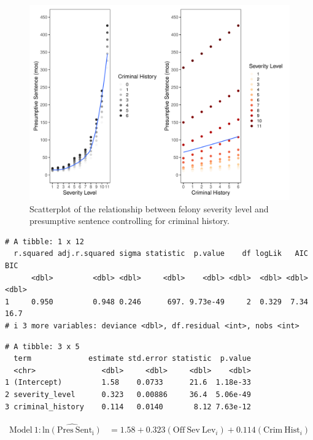 \documentclass[
  letterpaper,
  DIV=11,
  numbers=noendperiod]{scrartcl}
\begin{document}
\begin{figure}

{\centering \includegraphics{sentencing_grid_files/figure-pdf/fig-scatter-1.pdf}

}

\caption{\label{fig-scatter}Scatterplot of the relationship between
felony severity level and presumptive sentence controlling for criminal
history.}

\end{figure}

\begin{verbatim}
# A tibble: 1 x 12
  r.squared adj.r.squared sigma statistic  p.value    df logLik   AIC   BIC
      <dbl>         <dbl> <dbl>     <dbl>    <dbl> <dbl>  <dbl> <dbl> <dbl>
1     0.950         0.948 0.246      697. 9.73e-49     2  0.329  7.34  16.7
# i 3 more variables: deviance <dbl>, df.residual <int>, nobs <int>
\end{verbatim}

\begin{verbatim}
# A tibble: 3 x 5
  term             estimate std.error statistic  p.value
  <chr>               <dbl>     <dbl>     <dbl>    <dbl>
1 (Intercept)         1.58    0.0733      21.6  1.18e-33
2 severity_level      0.323   0.00886     36.4  5.06e-49
3 criminal_history    0.114   0.0140       8.12 7.63e-12
\end{verbatim}

\[
\begin{split}
\mathrm{Model~1}: \hat{\mathrm{ln(Pres~Sent_i)}} &= 1.58 + 0.323(\mathrm{Off~Sev~Lev}_i) + 0.114(\mathrm{Crim~Hist}_i)
\end{split}
\]
\end{document}
